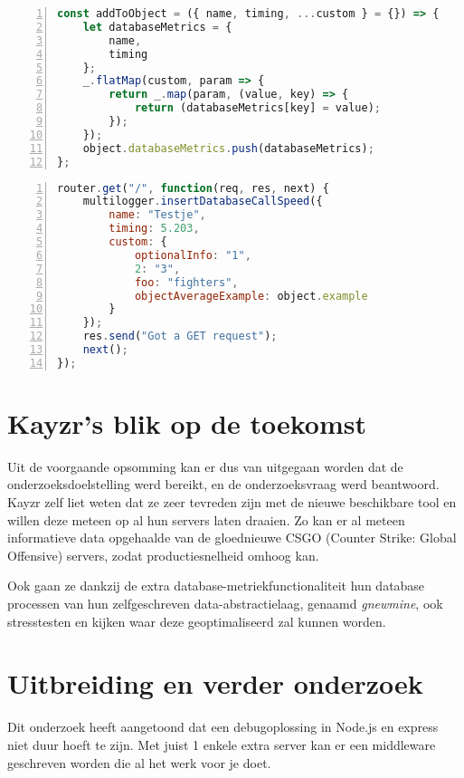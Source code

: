 \begin{lstlisting}[language=JavaScript, breaklines=true, numbers=left, frame=single, caption={Extra informatie wordt doorgestuurd naar InfluxDB},label=code:addToObject]
const addToObject = ({ name, timing, ...custom } = {}) => {
	let databaseMetrics = {
		name,
		timing
	};
	_.flatMap(custom, param => {
		return _.map(param, (value, key) => {
			return (databaseMetrics[key] = value);
		});
	});
	object.databaseMetrics.push(databaseMetrics);
};
\end{lstlisting}
\begin{lstlisting}[language=JavaScript, breaklines=true, numbers=left, frame=single, caption={Deze functie kan overal in de API worden opgeroepen},label=code:plugin]
router.get("/", function(req, res, next) {
	multilogger.insertDatabaseCallSpeed({
		name: "Testje",
		timing: 5.203,
		custom: {
			optionalInfo: "1",
			2: "3",
			foo: "fighters",
			objectAverageExample: object.example
		}
	});
	res.send("Got a GET request");
	next();
});
\end{lstlisting}


\section{Kayzr's blik op de toekomst}
\label{sec:future}

Uit de voorgaande opsomming kan er dus van uitgegaan worden dat de onderzoeksdoelstelling werd bereikt, en de onderzoeksvraag werd beantwoord. Kayzr zelf liet weten dat ze zeer tevreden zijn met de nieuwe beschikbare tool en willen deze meteen op al hun servers laten draaien. Zo kan er al meteen informatieve data opgehaalde van de gloednieuwe CSGO (Counter Strike: Global Offensive) servers, zodat productiesnelheid omhoog kan.

Ook gaan ze dankzij de extra database-metriekfunctionaliteit hun database processen van hun zelfgeschreven data-abstractielaag, genaamd \textit{gnewmine}, ook stresstesten en kijken waar deze geoptimaliseerd zal kunnen worden.

\section{Uitbreiding en verder onderzoek}
\label{sec:expansin}

Dit onderzoek heeft aangetoond dat een debugoplossing in Node.js en express niet duur hoeft te zijn. Met juist 1 enkele extra server kan er een middleware geschreven worden die al het werk voor je doet. 

